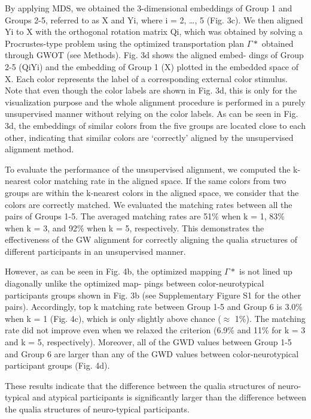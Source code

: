 \documentclass[
  authoryear]{elsarticle}
\begin{document}
By applying MDS, we obtained the 3-dimensional embeddings of Group 1 and
Groups 2-5, referred to as X and Yi, where i = 2, \ldots, 5 (Fig. 3c).
We then aligned Yi to X with the orthogonal rotation matrix Qi, which
was obtained by solving a Procrustes-type problem using the optimized
transportation plan \(\Gamma*\) obtained through GWOT (see Methods).
Fig. 3d shows the aligned embed- dings of Group 2-5 (QiYi) and the
embedding of Group 1 (X) plotted in the embedded space of X. Each color
represents the label of a corresponding external color stimulus. Note
that even though the color labels are shown in Fig. 3d, this is only for
the visualization purpose and the whole alignment procedure is performed
in a purely unsupervised manner without relying on the color labels. As
can be seen in Fig. 3d, the embeddings of similar colors from the five
groups are located close to each other, indicating that similar colors
are `correctly' aligned by the unsupervised alignment method.

To evaluate the performance of the unsupervised alignment, we computed
the k-nearest color matching rate in the aligned space. If the same
colors from two groups are within the k-nearest colors in the aligned
space, we consider that the colors are correctly matched. We evaluated
the matching rates between all the pairs of Groups 1-5. The averaged
matching rates are 51\% when k = 1, 83\% when k = 3, and 92\% when k =
5, respectively. This demonstrates the effectiveness of the GW alignment
for correctly aligning the qualia structures of different participants
in an unsupervised manner.

However, as can be seen in Fig. 4b, the optimized mapping \(\Gamma*\) is
not lined up diagonally unlike the optimized map- pings between
color-neurotypical participants groups shown in Fig. 3b (see
Supplementary Figure S1 for the other pairs). Accordingly, top k
matching rate between Group 1-5 and Group 6 is 3.0\% when k = 1 (Fig.
4c), which is only slightly above chance (\(\approx\) 1\%). The matching
rate did not improve even when we relaxed the criterion (6.9\% and 11\%
for k = 3 and k = 5, respectively). Moreover, all of the GWD values
between Group 1-5 and Group 6 are larger than any of the GWD values
between color-neurotypical participant groups (Fig. 4d).

These results indicate that the difference between the qualia structures
of neuro-typical and atypical participants is significantly larger than
the difference between the qualia structures of neuro-typical
participants.
\end{document}

